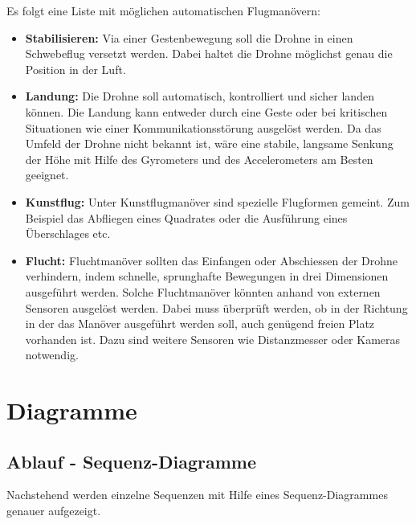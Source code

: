Es folgt eine Liste mit möglichen automatischen Flugmanövern:
\begin{itemize}
	\item \textbf{Stabilisieren:}
	Via einer Gestenbewegung soll die Drohne in einen Schwebeflug versetzt werden. Dabei haltet die Drohne möglichst genau die Position in der Luft.

	\item \textbf{Landung:}
	Die Drohne soll automatisch, kontrolliert und sicher landen können. Die Landung kann entweder durch eine Geste oder bei kritischen Situationen wie einer Kommunikationsstörung ausgelöst werden.
	Da das Umfeld der Drohne nicht bekannt ist, wäre eine stabile, langsame Senkung der Höhe mit Hilfe des Gyrometers und des Accelerometers am Besten geeignet.

	\item \textbf{Kunstflug:}
	Unter Kunstflugmanöver sind spezielle Flugformen gemeint. Zum Beispiel das Abfliegen eines Quadrates oder die Ausführung eines Überschlages etc.

	\item \textbf{Flucht:}
	Fluchtmanöver sollten das Einfangen oder Abschiessen der Drohne verhindern, indem schnelle, sprunghafte Bewegungen in drei Dimensionen ausgeführt werden.
	Solche Fluchtmanöver könnten anhand von externen Sensoren ausgelöst werden.
	Dabei muss überprüft werden, ob in der Richtung in der das Manöver ausgeführt werden soll, auch genügend freien Platz vorhanden ist.
	Dazu sind weitere Sensoren wie Distanzmesser oder Kameras notwendig.

\end{itemize}


\newpage
\section{Diagramme}

\subsection{Ablauf - Sequenz-Diagramme}
Nachstehend werden einzelne Sequenzen mit Hilfe eines Sequenz-Diagrammes genauer aufgezeigt.

